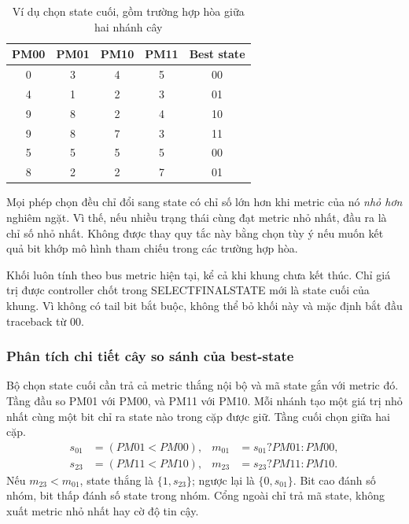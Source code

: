 \documentclass[12pt,a4paper]{article}
\renewcommand{\_}{\originalunderscore\allowbreak}
\begin{document}
\begin{table}[H]\centering\small
\begin{tabular}{ccccc}\toprule
\textbf{PM00}&\textbf{PM01}&\textbf{PM10}&\textbf{PM11}&\textbf{Best state}\\\midrule
0&3&4&5&00\\4&1&2&3&01\\9&8&2&4&10\\9&8&7&3&11\\
5&5&5&5&00\\8&2&2&7&01\\
\bottomrule\end{tabular}
\caption{Ví dụ chọn state cuối, gồm trường hợp hòa giữa hai nhánh cây}\label{tab:best-examples}
\end{table}
Mọi phép chọn đều chỉ đổi sang state có chỉ số lớn hơn khi metric của nó \emph{nhỏ hơn} nghiêm ngặt. Vì thế, nếu nhiều trạng thái cùng đạt metric nhỏ nhất, đầu ra là chỉ số nhỏ nhất. Không được thay quy tắc này bằng chọn tùy ý nếu muốn kết quả bit khớp mô hình tham chiếu trong các trường hợp hòa.

Khối luôn tính theo bus metric hiện tại, kể cả khi khung chưa kết thúc. Chỉ giá trị được controller chốt trong SELECT\_FINAL\_STATE mới là state cuối của khung. Vì không có tail bit bắt buộc, không thể bỏ khối này và mặc định bắt đầu traceback từ 00.


\subsubsection{Phân tích chi tiết cây so sánh của best-state}
Bộ chọn state cuối cần trả cả metric thắng nội bộ và mã state gắn với metric đó. Tầng đầu so PM01 với PM00, và PM11 với PM10. Mỗi nhánh tạo một giá trị nhỏ nhất cùng một bit chỉ ra state nào trong cặp được giữ. Tầng cuối chọn giữa hai cặp.
\begin{equation}
\begin{aligned}
s_{01}&=(PM01<PM00),&m_{01}&=s_{01}?PM01:PM00,\\
s_{23}&=(PM11<PM10),&m_{23}&=s_{23}?PM11:PM10.
\end{aligned}
\end{equation}
Nếu $m_{23}<m_{01}$, state thắng là $\{1,s_{23}\}$; ngược lại là $\{0,s_{01}\}$. Bit cao đánh số nhóm, bit thấp đánh số state trong nhóm. Cổng ngoài chỉ trả mã state, không xuất metric nhỏ nhất hay cờ độ tin cậy.
\end{document}

